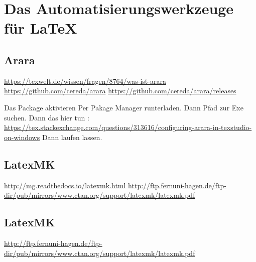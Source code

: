 \chapter{Das Automatisierungswerkzeuge für \LaTeX}

\section{Arara}
\url{https://texwelt.de/wissen/fragen/8764/was-ist-arara}
\url{https://github.com/cereda/arara}
\url{https://github.com/cereda/arara/releases}

Das Package aktivieren
Per Pakage Manager runterladen.
Dann Pfad zur Exe suchen. 
Dann das hier tun : \url{https://tex.stackexchange.com/questions/313616/configuring-arara-in-texstudio-on-windows}
Dann laufen lassen.
\section{LatexMK}

\url{http://mg.readthedocs.io/latexmk.html}
\url{http://ftp.fernuni-hagen.de/ftp-dir/pub/mirrors/www.ctan.org/support/latexmk/latexmk.pdf}
\section{LatexMK}
\url{http://ftp.fernuni-hagen.de/ftp-dir/pub/mirrors/www.ctan.org/support/latexmk/latexmk.pdf}
